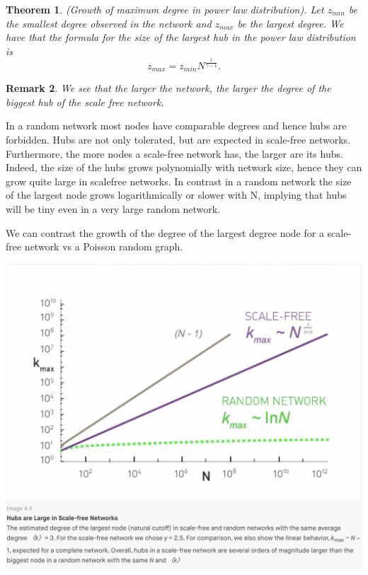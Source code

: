 \documentclass[twoside]{article}
\newcounter{lecnum}
\newtheorem{theorem}{Theorem}[lecnum]
\newtheorem{remark}[theorem]{Remark}
\begin{document}
\begin{theorem}(Growth of maximum degree in power law distribution). Let $z_{min}$ be the smallest degree observed in the network and $z_{max}$ be the largest degree. We have that the formula for the size of the largest hub in the power law distribution is 
$$
z_{max} = z_{min}N^{\frac{1}{\gamma - 1}}.
$$
\end{theorem}

\begin{remark}We see that the larger the network, the larger the degree of the biggest hub of the scale free network.
\end{remark}

In a random network most nodes have comparable degrees and hence hubs are forbidden. Hubs are not only tolerated, but are expected in scale-free networks. Furthermore, the more nodes a scale-free network has, the larger are its hubs. Indeed, the size of the hubs grows polynomially with network size, hence they can grow quite large in scalefree networks. In contrast in a random network the size of the largest node grows logarithmically or slower with N, implying that hubs will be tiny even in a very large random network.

We can contrast the growth of the degree of the largest degree node for a scale-free network vs a Poisson random graph.
\begin{center}
\includegraphics[scale=0.3]{Growth-hub}
\end{center}
\end{document}
